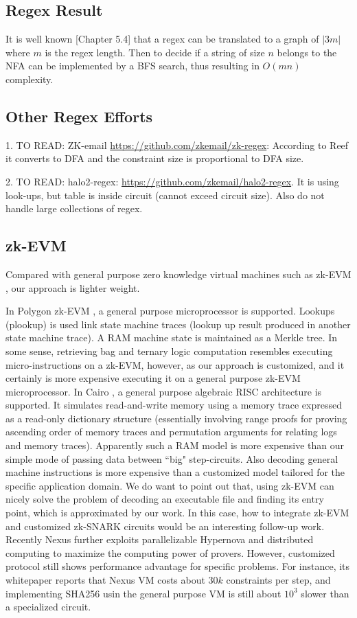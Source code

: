 \subsection{Regex Result}
It is well known \cite{AlgBook}[Chapter 5.4] that a regex
can be translated to a graph of $|3m|$ where $m$ is the
regex length. Then to decide if a string of size $n$
belongs to the NFA can be implemented by a BFS search,
thus resulting in $O(mn)$ complexity.

\subsection{Other Regex Efforts}
1. TO READ: ZK-email \url{https://github.com/zkemail/zk-regex}:
According to Reef it converts to DFA and the constraint size
is proportional to DFA size.

2. TO READ: halo2-regex: \url{https://github.com/zkemail/halo2-regex}.
It is using look-ups, but table is inside circuit (cannot exceed
circuit size). Also do not handle large collections of regex.

\subsection{zk-EVM}
Compared with general purpose zero knowledge virtual machines 
such as zk-EVM \cite{polygonevm}, our approach is lighter weight.

In Polygon zk-EVM \cite{polygonevm}, 
a general purpose microprocessor is supported.
Lookups (plookup) is used link state machine traces (lookup up
result produced in another state machine trace).
A RAM machine state is maintained as a Merkle tree.
In some sense, retrieving bag and ternary logic computation
resembles executing micro-instructions on a zk-EVM, however,
as our approach is customized, and it certainly is more
expensive executing it on a general purpose zk-EVM microprocessor.
In Cairo \cite{Cairo}, a general purpose algebraic RISC architecture
is supported. It simulates read-and-write memory using
a memory trace expressed as a read-only dictionary structure
(essentially involving range proofs for proving ascending order
of memory traces and permutation arguments for relating logs
and memory traces). Apparently such a RAM model is more expensive
than our simple mode of passing data between ``big" step-circuits.
Also decoding general machine instructions is more expensive
than a customized model tailored for the specific application domain.
We do want to point out that, using zk-EVM can nicely solve
the problem of decoding an executable file and finding its
entry point, which is approximated by our work. In this case,
how to integrate zk-EVM and customized zk-SNARK circuits would
be an interesting follow-up work.
Recently Nexus \cite{Nexus} further exploits
parallelizable Hypernova \cite{HyperNova} 
and distributed computing to maximize the computing power
of provers. However, customized protocol still shows performance
advantage for specific problems. For instance, its whitepaper
reports that
Nexus VM costs about $30k$ constraints per step, and 
implementing SHA256 usin the general purpose VM is still
about $10^3$ slower than a specialized circuit.

